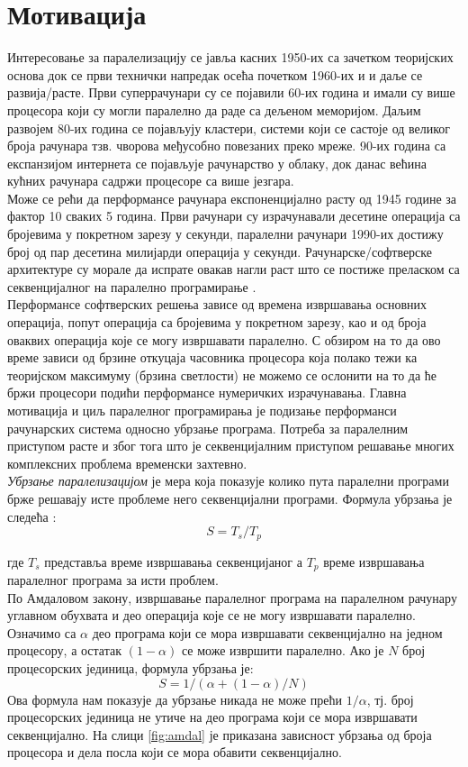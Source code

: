 \documentclass[12pt,oneside]{memoir}
\begin{document}
  \section{Мотивација}
  Интересовање за паралелизацију се јавља касних 1950-их са зачетком теоријских основа док се први технички напредак осећа почетком 1960-их и и даље се развија/расте. Први суперрачунари су се појавили 60-их година и имали су више процесора који су могли паралелно да раде са дељеном меморијом. Даљим развојем 80-их година се појављују кластери, системи који се састоје од великог броја рачунара тзв. чворова међусобно повезаних преко мреже. 90-их година са експанзијом интернета се појављује рачунарство у облаку, док данас већина кућних рачунара садржи процесоре са више језгара. \\
  \indent Може се рећи да перформансе рачунара експоненцијално расту од 1945 године за фактор 10 сваких 5 година. Први рачунари су израчунавали десетине операција са бројевима у покретном зарезу у секунди, паралелни рачунари 1990-их достижу број од пар десетина милијарди операција у секунди. Рачунарске/софтверске архитектуре су морале да испрате овакав нагли раст што се постиже преласком са секвенцијалног на паралелно програмирање \cite{par_history}.
  \\
 \indent Перформансе софтверских решења зависе од времена извршавања основних операција, попут операција са бројевима у покретном зарезу, као и од броја оваквих операција које се могу извршавати паралелно. С обзиром на то да ово време зависи од брзине откуцаја часовника процесора која полако тежи ка теоријском максимуму (брзина светлости) не можемо се ослонити на то да ће бржи процесори подићи перформансе нумеричких израчунавања. Главна мотивација и циљ паралелног програмирања је подизање перформанси рачунарских система односно убрзање програма. Потреба за паралелним приступом расте и због тога што је секвенцијалним приступом решавање многих комплексних проблема временски захтевно. 
 \\
\indent \emph{Убрзање паралелизацијом} је мера која показује колико пута паралелни програми брже решавају исте проблеме него секвенцијални програми. Формула убрзања је следећа \cite{par_various}:
 	$$ S = T_s/T_p $$
 	
\noindent где $ T_s $ представља време извршавања секвенцијаног а $ T_p $ време извршавања паралелног програма за исти проблем. 
 	\\
 	\indent По Амдаловом закону, извршавање паралелног програма на паралелном рачунару углавном обухвата и део операција које се не могу извршавати паралелно. Означимо са $ \alpha $ део програма који се мора извршавати секвенцијално на једном процесору, а остатак $ (1 - \alpha)$ се може извршити паралелно. Ако је $ N $ број процесорских јединица, формула убрзања је: 
 	$$ S = 1 / ( \alpha + (1-\alpha)/N)$$
Ова формула нам показује да убрзање никада не може прећи $ 1/\alpha $, тј. број процесорских јединица не утиче на део програма који се мора извршавати секвенцијално. На слици \ref{fig:amdal} је приказана зависност убрзања од броја процесора и дела посла који се мора обавити секвенцијално.
\end{document}
